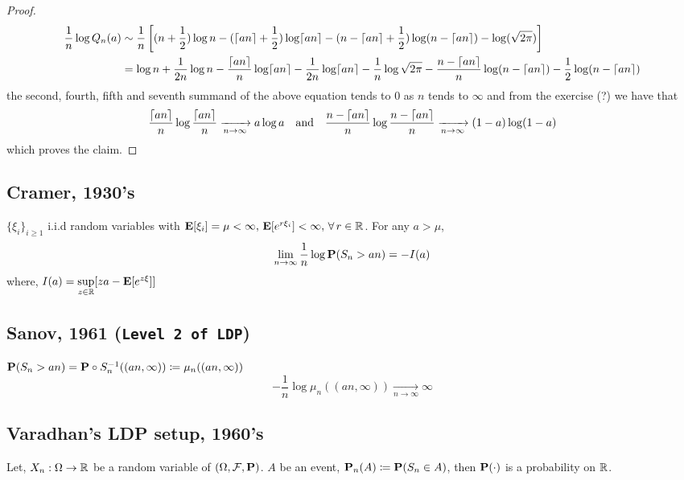 \documentclass[main]{subfiles}
\begin{document}
\begin{proof}
	
	\begin{align*}
		\frac{1}{n}\log Q_{n}(a) &\sim \frac{1}{n}\left[ (n+\frac{1}{2})\log n - (\ceil{an}+\frac{1}{2})\log \ceil{an} - (n-\ceil{an} + \frac{1}{2})\log(n-\ceil{an})  - \log (\sqrt{2\pi})\right] \\
		&= \log n + \frac{1}{2n}\log n - \frac{\ceil{an}}{n}\log \ceil{an} - \frac{1}{2n}\log \ceil{an} - \frac{1}{n}\log \sqrt{2\pi}-\frac{n- \ceil{an}}{n} \log (n - \ceil{an}) - \frac{1}{2}\log (n-\ceil{an}) 
	\end{align*}
	the second, fourth, fifth and seventh summand of the above equation tends to 0 as $n$ tends to $\infty$ and from the exercise (?) we have that 
	$$\frac{\ceil{an}}{n}\log \frac{\ceil{an}}{n} \xrightarrow[n \rightarrow \infty]{} a\log a\,\,\,\,\,\,\text{and}\,\,\,\,\,\,\frac{n-\ceil{an}}{n}\log \frac{n-\ceil{an}}{n} \xrightarrow[n \rightarrow \infty]{} (1-a)\log (1-a)$$ 
	which proves the claim.
\end{proof}

\subsection*{Cramer, 1930's}
$\{\xi_i\}_{i\geq 1}$ i.i.d random variables with $\E[\xi_i] = \mu < \infty,\,\E[e^{r\xi_i}] < \infty,\,\forall \, r \in \R$. For any $a > \mu$, 
$$\lim\limits_{n \to \infty} \frac{1}{n}\log \P(S_n > an) = -I(a)$$ where, $I(a) = \sup\limits_{z \in \R}[za-\E[e^{z\xi}]]$

\subsection*{Sanov, 1961 (\texttt{Level 2 of LDP})} 
$\P(S_n > an) = \P \circ S_{n}^{-1}((an,\infty)) \coloneqq \mu_{n}((an,\infty))$
$$-\frac{1}{n}\log \mu_{n}((an,\infty)) \xrightarrow[n \rightarrow \infty]{} \infty$$

\subsection*{Varadhan's LDP setup, 1960's}
Let, $X_n : \Omega \to \R$ be a random variable of $(\Omega, \mathcal{F}, \P)$. $A$ be an event, $\P_{n}(A) \coloneqq \P(S_n \in A)$, then $\P(\cdot)$ is a probability on $\R$. \\
\end{document}
